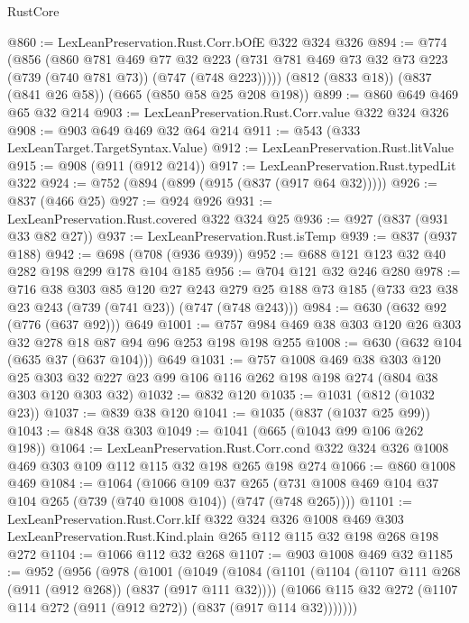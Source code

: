 \begin{lexlean}{RustCore}
\begin{coremodule}
@860 := LexLeanPreservation.Rust.Corr.bOfE @322 @324 @326
@894 := @774
    (@856
      (@860
        @781
        @469
        @77
        @32
        @223
        (@731 @781 @469 @73 @32 @73 @223 (@739 (@740 @781 @73)) (@747 (@748 @223)))))
    (@812 (@833 @18))
    (@837 (@841 @26 @58))
    (@665 (@850 @58 @25 @208 @198))
@899 := @860 @649 @469 @65 @32 @214
@903 := LexLeanPreservation.Rust.Corr.value @322 @324 @326
@908 := @903 @649 @469 @32 @64 @214
@911 := @543 (@333 LexLeanTarget.TargetSyntax.Value)
@912 := LexLeanPreservation.Rust.litValue
@915 := @908 (@911 (@912 @214))
@917 := LexLeanPreservation.Rust.typedLit @322
@924 := @752 (@894 (@899 (@915 (@837 (@917 @64 @32)))))
@926 := @837 (@466 @25)
@927 := @924 @926
@931 := LexLeanPreservation.Rust.covered @322 @324 @25
@936 := @927 (@837 (@931 @33 @82 @27))
@937 := LexLeanPreservation.Rust.isTemp
@939 := @837 (@937 @188)
@942 := @698 (@708 (@936 @939))
@952 := @688 @121 @123 @32 @40 @282 @198 @299 @178 @104 @185
@956 := @704 @121 @32 @246 @280
@978 := @716
    @38
    @303
    @85
    @120
    @27
    @243
    @279
    @25
    @188
    @73
    @185
    (@733 @23 @38 @23 @243 (@739 (@741 @23)) (@747 (@748 @243)))
@984 := @630 (@632 @92 (@776 (@637 @92))) @649
@1001 := @757 @984 @469 @38 @303 @120 @26 @303 @32 @278 @18 @87 @94 @96 @253 @198 @198 @255
@1008 := @630 (@632 @104 (@635 @37 (@637 @104))) @649
@1031 := @757
    @1008
    @469
    @38
    @303
    @120
    @25
    @303
    @32
    @227
    @23
    @99
    @106
    @116
    @262
    @198
    @198
    @274
    (@804 @38 @303 @120 @303 @32)
@1032 := @832 @120
@1035 := @1031 (@812 (@1032 @23))
@1037 := @839 @38 @120
@1041 := @1035 (@837 (@1037 @25 @99))
@1043 := @848 @38 @303
@1049 := @1041 (@665 (@1043 @99 @106 @262 @198))
@1064 := LexLeanPreservation.Rust.Corr.cond
    @322
    @324
    @326
    @1008
    @469
    @303
    @109
    @112
    @115
    @32
    @198
    @265
    @198
    @274
@1066 := @860 @1008 @469
@1084 := @1064
    (@1066
      @109
      @37
      @265
      (@731 @1008 @469 @104 @37 @104 @265 (@739 (@740 @1008 @104)) (@747 (@748 @265))))
@1101 := LexLeanPreservation.Rust.Corr.kIf
    @322
    @324
    @326
    @1008
    @469
    @303
    LexLeanPreservation.Rust.Kind.plain
    @265
    @112
    @115
    @32
    @198
    @268
    @198
    @272
@1104 := @1066 @112 @32 @268
@1107 := @903 @1008 @469 @32
@1185 := @952
    (@956
      (@978
        (@1001
          (@1049
            (@1084
              (@1101
                (@1104 (@1107 @111 @268 (@911 (@912 @268)) (@837 (@917 @111 @32))))
                (@1066 @115 @32 @272 (@1107 @114 @272 (@911 (@912 @272)) (@837 (@917 @114 @32)))))))

\end{coremodule}
\end{lexlean}
